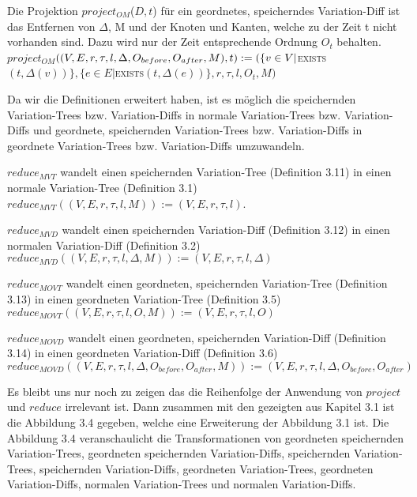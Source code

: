 \begin{definition}
	Die Projektion $project_{OM}$($D,t$) für ein geordnetes, speicherndes Variation-Diff ist das Entfernen von $\Delta$, M und der Knoten und Kanten, welche zu der Zeit t nicht vorhanden sind. Dazu wird nur der Zeit entsprechende Ordnung $O_t$ behalten.\\ $project_{OM}$$((V,E,r,\tau,l,\Delta,O_{before},O_{after},M),t)\\ := (\{v \in V | $\textsc{exists}$(t,\Delta(v))\},\{e \in E | $\textsc{exists}$(t,\Delta(e))\},r,\tau,l,O_t,M)$
\end{definition}
Da wir die Definitionen erweitert haben, ist es  möglich die speichernden Variation-Trees bzw. Variation-Diffs in normale Variation-Trees bzw. Variation-Diffs und geordnete, speichernden Variation-Trees bzw. Variation-Diffs in geordnete Variation-Trees bzw. Variation-Diffs umzuwandeln. 
\begin{definition}
	$reduce_{MVT}$ wandelt einen speichernden Variation-Tree (Definition 3.11) in einen normale Variation-Tree (Definition 3.1) \\
	$reduce_{MVT}((V,E,r,\tau,l,M)) := (V,E,r,\tau,l)$.
\end{definition}
\begin{definition}
	$reduce_{MVD}$ wandelt einen speichernden Variation-Diff (Definition 3.12) in einen normalen Variation-Diff (Definition 3.2) \\
	$reduce_{MVD}((V,E,r,\tau,l,\Delta,M)) := (V,E,r,\tau,l,\Delta)$
\end{definition}
\begin{definition}
	$reduce_{MOVT}$ wandelt einen geordneten, speichernden Variation-Tree (Definition 3.13) in einen geordneten Variation-Tree (Definition 3.5) \\
	$reduce_{MOVT}((V,E,r,\tau,l,O,M)) := (V,E,r,\tau,l,O)$
\end{definition}
\begin{definition}
	$reduce_{MOVD}$ wandelt einen geordneten, speichernden Variation-Diff (Definition 3.14) in einen geordneten Variation-Diff (Definition 3.6) \\
	$reduce_{MOVD}((V,E,r,\tau,l,\Delta,O_{before},O_{after},M)) := (V,E,r,\tau,l,\Delta,O_{before},O_{after})$
\end{definition}
Es bleibt uns nur noch zu zeigen das die Reihenfolge der Anwendung von $project$ und $reduce$ irrelevant ist. Dann zusammen mit den gezeigten aus Kapitel 3.1 ist die Abbildung 3.4 gegeben, welche eine Erweiterung der Abbildung 3.1 ist. Die Abbildung 3.4 veranschaulicht die Transformationen von geordneten speichernden Variation-Trees, geordneten speichernden Variation-Diffs,  speichernden Variation-Trees, speichernden Variation-Diffs, geordneten Variation-Trees, geordneten Variation-Diffs, normalen Variation-Trees und normalen Variation-Diffs.
